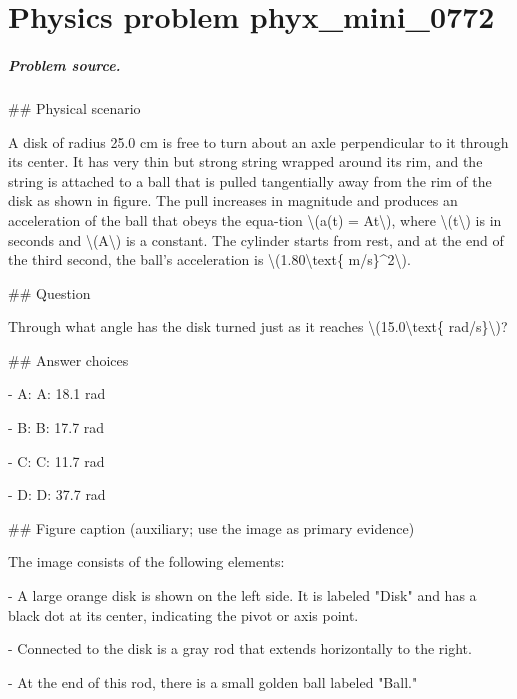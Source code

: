 
\chapter{Physics problem phyx\_mini\_0772}
\label{ch:PhyXMiniProblems_problem_phyx_mini_0772}

\paragraph{Problem source.}
\#\# Physical scenario

A disk of radius 25.0 cm is free to turn about an axle perpendicular to it through its center. It has very thin but strong string wrapped around its rim, and the string is attached to a ball that is pulled tangentially away from the rim of the disk as shown in figure. The pull increases in magnitude and produces an acceleration of the ball that obeys the equa-tion \textbackslash{}(a(t) = At\textbackslash{}), where \textbackslash{}(t\textbackslash{}) is in seconds and \textbackslash{}(A\textbackslash{}) is a constant. The cylinder starts from rest, and at the end of the third second, the ball’s acceleration is \textbackslash{}(1.80\textbackslash{}text\{ m/s\}\textasciicircum{}2\textbackslash{}).

\#\# Question

Through what angle has the disk turned just as it reaches \textbackslash{}(15.0\textbackslash{}text\{ rad/s\}\textbackslash{})?

\#\# Answer choices

- A: A: 18.1 rad

- B: B: 17.7 rad

- C: C: 11.7 rad

- D: D: 37.7 rad

\#\# Figure caption (auxiliary; use the image as primary evidence)

The image consists of the following elements:

- A large orange disk is shown on the left side. It is labeled "Disk" and has a black dot at its center, indicating the pivot or axis point.
  
- Connected to the disk is a gray rod that extends horizontally to the right.

- At the end of this rod, there is a small golden ball labeled "Ball."

